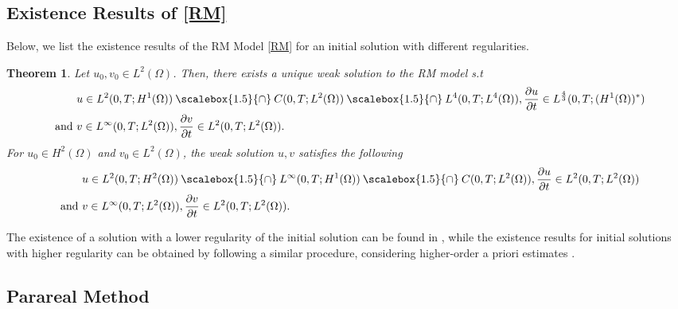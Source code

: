 \documentclass[11pt]{article}
\newcommand*{\medcap}{\mathbin{\scalebox{1.5}{\ensuremath{\cap}}}}
\newtheorem{theorem}{Theorem}[section]
\begin{document}
\subsection{Existence Results of \eqref{RM}}
Below, we list the existence results of the RM Model \eqref{RM} for an initial solution with different regularities.
\begin{theorem}\label{thm1}
Let $u_0, v_0\in L^2(\Omega)$. Then, there exists a unique weak solution to the RM model s.t
\begin{align*}
& u\in L^2(0,T;H^1(\Omega)) \medcap C(0,T;L^2(\Omega)) \medcap L^4(0,T;L^4(\Omega)), \frac{\partial u}{\partial t}\in L^{\frac{4}{3}}(0,T;(H^1(\Omega))^*)\\
\text{ and } & v\in L^{\infty}(0,T; L^2(\Omega)), \frac{\partial v}{\partial t}\in L^{2}(0,T; L^2(\Omega)).
\end{align*}
For $u_0\in H^2(\Omega)$ and $v_0\in L^2(\Omega)$, the weak solution $u, v$ satisfies the following 
\begin{align*}
& u\in L^2(0,T;H^2(\Omega)) \medcap L^{\infty}(0,T;H^1(\Omega))\medcap C(0,T;L^2(\Omega)), \frac{\partial u}{\partial t}\in L^{2}(0,T;L^2(\Omega)) \\
\text{ and } & v\in L^{\infty}(0,T; L^2(\Omega)), \frac{\partial v}{\partial t}\in L^{2}(0,T; L^2(\Omega)).
\end{align*}
\end{theorem}
The existence of a solution with a lower regularity of the initial solution can be found in \cite{Bourgault08, KW1}, while the existence results for initial solutions with higher regularity can be obtained by following a similar procedure, considering higher-order a priori estimates \cite{jackson1990existence}. 


\subsection{ Parareal Method} \label{Section2-Parareal}
\end{document}
